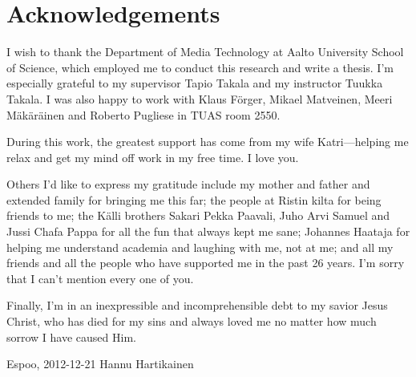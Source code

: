 \documentclass[12pt,a4paper,oneside]{report}
\newcommand{\DATE}{2012-12-21}
\newcommand{\AUTHOR}{Hannu Hartikainen}
\begin{document}
\chapter*{Acknowledgements}

I wish to thank the Department of Media Technology at Aalto University School of Science, which employed me to conduct this research and write a thesis. I'm especially grateful to my supervisor Tapio Takala and my instructor Tuukka Takala. I was also happy to work with Klaus Förger, Mikael Matveinen, Meeri Mäkäräinen and Roberto Pugliese in TUAS room 2550.

During this work, the greatest support has come from my wife Katri---helping me relax and get my mind off work in my free time. I love you.

Others I'd like to express my gratitude include my mother and father and extended family for bringing me this far; the people at Ristin kilta for being friends to me; the Källi brothers Sakari Pekka Paavali, Juho Arvi Samuel and Jussi Chafa Pappa for all the fun that always kept me sane; Johannes Haataja for helping me understand academia and laughing with me, not at me; and all my friends and all the people who have supported me in the past 26 years. I'm sorry that I can't mention every one of you.

Finally, I'm in an inexpressible and incomprehensible debt to my savior Jesus Christ, who has died for my sins and always loved me no matter how much sorrow I have caused Him.

\vskip 10mm

\noindent Espoo, \DATE
\vskip 5mm
\noindent\AUTHOR




\cleardoublepage
\tableofcontents
\end{document}
